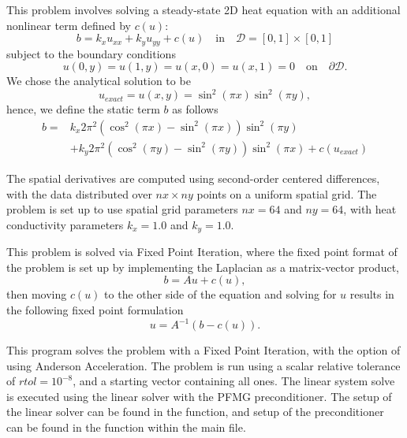 This problem involves solving a steady-state 2D heat equation with an additional
nonlinear term defined by $c(u)$:
\begin{equation}
    b = k_x u_{xx} + k_y u_{yy} + c(u) \quad \text{in} \quad \mathcal{D}
        = [0,1] \times [0,1]
\end{equation}
subject to the boundary conditions
\begin{equation}
    u(0,y) = u(1,y) = u(x,0) = u(x,1) = 0 \quad \text{on} \quad \partial \mathcal{D}.
\end{equation}
We chose the analytical solution to be
\begin{equation}
    u_{exact} = u(x,y) = \sin^2(\pi x) \sin^2(\pi y),
\end{equation}
hence, we define the static term $b$ as follows
\begin{equation}
\begin{aligned}
    b = &k_x 2 \pi^2 (\cos^2(\pi x) - \sin^2(\pi x)) \sin^2(\pi y) \\
        &+ k_y 2 \pi^2 (\cos^2(\pi y) - \sin^2(\pi y)) \sin^2(\pi x) + c(u_{exact})
\end{aligned}
\end{equation}

The spatial derivatives are computed using second-order centered
differences, with the data distributed over $nx\times ny$ points
on a uniform spatial grid.  
The problem is set up to use spatial grid parameters $nx=64$ and
$ny=64$, with heat conductivity parameters $k_x=1.0$ and
$k_y=1.0$.  

This problem is solved via Fixed Point Iteration, where the fixed point format
of the problem is set up by implementing the Laplacian as a matrix-vector product, 
\begin{equation}
    b = A u + c(u),
\end{equation}
then moving $c(u)$ to the other side of the equation 
and solving for $u$ results 
in the following fixed point formulation
\begin{equation}
    u = A^{-1} (b - c(u)).
\end{equation}

This program solves the problem with a Fixed Point Iteration, 
with the option of using Anderson Acceleration.
The problem is run using a scalar relative
tolerance of $rtol=10^{-8}$, and a starting
vector containing all ones.
The linear system solve is executed using the
 linear solver with
the {\hypre} PFMG preconditioner. The setup of the
linear solver can be found in the
 function, and setup of the {\hypre}
preconditioner can be found in the
 function within the main file.

